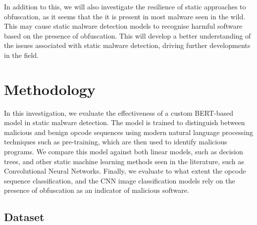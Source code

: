 \documentclass[conference,compsoc]{IEEEtran}
\begin{document}
In addition to this, we will also investigate the resilience of static approaches to obfuscation, as it seems that the it is present in most malware seen in the wild. This may cause static malware detection models to recognise harmful software based on the presence of obfuscation. This will develop a better understanding of the issues associated with static malware detection, driving further developments in the field.


\section{Methodology}



\noindent
In this investigation, we evaluate the effectiveness of a custom BERT-based model in static malware detection. The model is trained to distinguish between malicious and benign opcode sequences using modern natural language processing techniques such as pre-training, which are then used to identify malicious programs. We compare this model against both linear models, such as decision trees, and other static machine learning methods seen in the literature, such as Convolutional Neural Networks. Finally, we evaluate to what extent the opcode sequence classification, and the CNN image classification models rely on the presence of obfuscation as an indicator of malicious software.

\subsection{Dataset}\label{sec:dataset}
\end{document}
